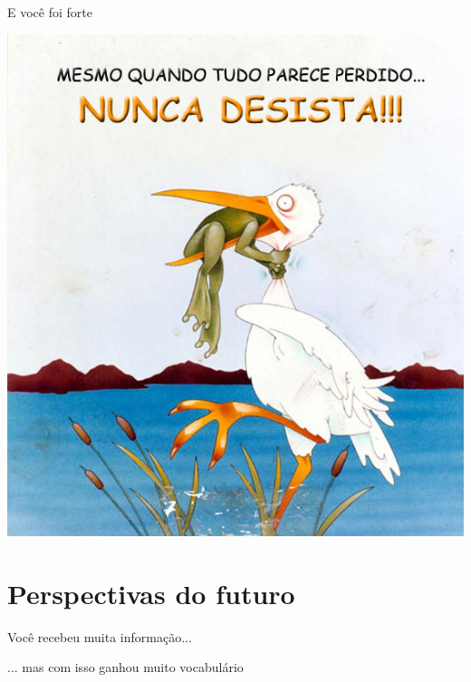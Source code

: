 \documentclass{beamer}
\begin{document}
\begin{frame}{E você foi forte}
  \begin{center}
    \includegraphics[height=.75\textheight]{Encerramento/naodesista3}

    \vfill
  \end{center}
\end{frame}

\section{Perspectivas do futuro}

\begin{frame}{\scriptsize }
  \begin{center}
    Você recebeu muita informação...

    \bigskip
    \bigskip
    \footnotesize
    ... mas com isso ganhou muito vocabulário
  \end{center}
\end{frame}
\end{document}
